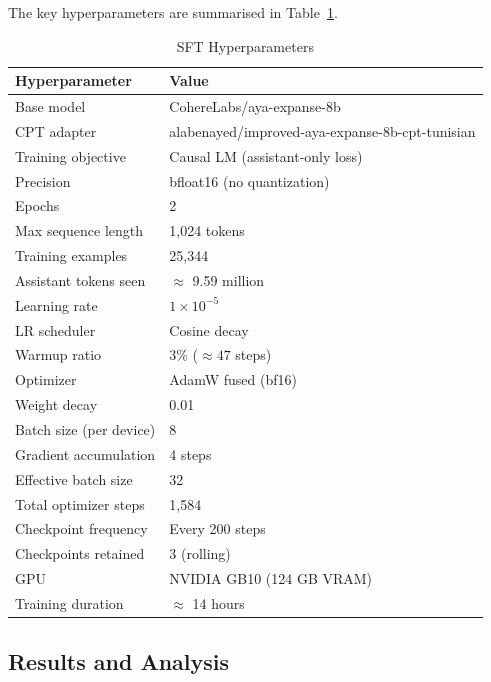 \documentclass[12pt,a4paper]{report}
\begin{document}
The key hyperparameters are summarised in Table~\ref{tab:sft_hparams}.
 \newpage
\begin{table}[h]
\centering
\caption{SFT Hyperparameters}
\label{tab:sft_hparams}
\begin{tabular}{ll}
\toprule
\textbf{Hyperparameter} & \textbf{Value} \\
\midrule
Base model              & CohereLabs/aya-expanse-8b \\
CPT adapter             & alabenayed/improved-aya-expanse-8b-cpt-tunisian \\
Training objective      & Causal LM (assistant-only loss) \\
Precision               & bfloat16 (no quantization) \\
Epochs                  & 2 \\
Max sequence length     & 1,024 tokens \\
Training examples       & 25,344 \\
Assistant tokens seen   & $\approx$ 9.59 million \\
Learning rate           & $1 \times 10^{-5}$ \\
LR scheduler            & Cosine decay \\
Warmup ratio            & 3\% ($\approx 47$ steps) \\
Optimizer               & AdamW fused (bf16) \\
Weight decay            & 0.01 \\
Batch size (per device) & 8 \\
Gradient accumulation   & 4 steps \\
Effective batch size    & 32 \\
Total optimizer steps   & 1,584 \\
Checkpoint frequency    & Every 200 steps \\
Checkpoints retained    & 3 (rolling) \\
GPU                     & NVIDIA GB10 (124 GB VRAM) \\
Training duration       & $\approx$ 14 hours \\
\bottomrule
\end{tabular}
\end{table}

\subsection{Results and Analysis}
\end{document}
